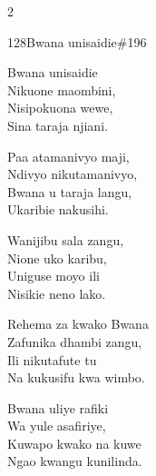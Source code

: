 \documentclass{article}
\begin{document}
\begin{multicols}{2}
\begin{hymn}{128}{Bwana unisaidie}{\#196}
\begin{stanza}
Bwana unisaidie\\
Nikuone maombini,\\
Nisipokuona wewe,\\
Sina taraja njiani.
\end{stanza}
\begin{chorus}
Paa atamanivyo maji,\\
Ndivyo nikutamanivyo,\\
Bwana u taraja langu,\\
Ukaribie nakusihi.
\end{chorus}
\begin{stanza}
Wanijibu sala zangu,\\
Nione uko karibu,\\
Uniguse moyo ili\\
Nisikie neno lako.
\end{stanza}
\begin{stanza}
Rehema za kwako Bwana\\
Zafunika dhambi zangu,\\
Ili nikutafute tu\\
Na kukusifu kwa wimbo.
\end{stanza}
\begin{stanza}
Bwana uliye rafiki\\
Wa yule asafiriye,\\
Kuwapo kwako na kuwe\\
Ngao kwangu kunilinda.
\end{stanza}
\end{hymn}


\end{multicols}
\end{document}
